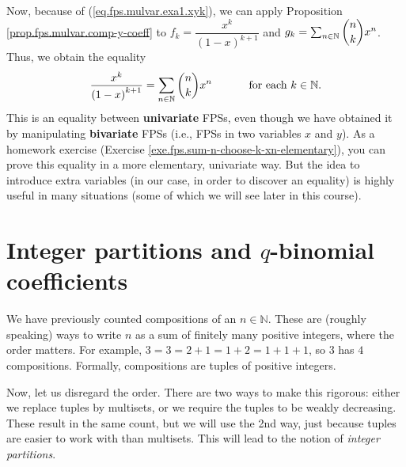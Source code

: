 Now, because of (\ref{eq.fps.mulvar.exa1.xyk}), we can apply Proposition
\ref{prop.fps.mulvar.comp-y-coeff} to $f_{k}=\dfrac{x^{k}}{\left(  1-x\right)
^{k+1}}$ and $g_{k}=\sum_{n\in\mathbb{N}}\dbinom{n}{k}x^{n}$. Thus, we obtain
the equality%
\[
\dfrac{x^{k}}{\left(  1-x\right)  ^{k+1}}=\sum_{n\in\mathbb{N}}\dbinom{n}%
{k}x^{n}\ \ \ \ \ \ \ \ \ \ \text{for each }k\in\mathbb{N}.
\]
This is an equality between \textbf{univariate} FPSs, even though we have
obtained it by manipulating \textbf{bivariate} FPSs (i.e., FPSs in two
variables $x$ and $y$). As a homework exercise (Exercise
\ref{exe.fps.sum-n-choose-k-xn-elementary}), you can prove this equality in a
more elementary, univariate way. But the idea to introduce extra variables (in
our case, in order to discover an equality) is highly useful in many
situations (some of which we will see later in this course).

\section{\label{chap.pars}Integer partitions and $q$-binomial coefficients}

We have previously counted compositions of an $n\in\mathbb{N}$. These are
(roughly speaking) ways to write $n$ as a sum of finitely many positive
integers, where the order matters. For example, $3=3=2+1=1+2=1+1+1$, so $3$
has $4$ compositions. Formally, compositions are tuples of positive integers.

Now, let us disregard the order. There are two ways to make this rigorous:
either we replace tuples by multisets, or we require the tuples to be weakly
decreasing. These result in the same count, but we will use the 2nd way, just
because tuples are easier to work with than multisets. This will lead to the
notion of \emph{integer partitions}.
